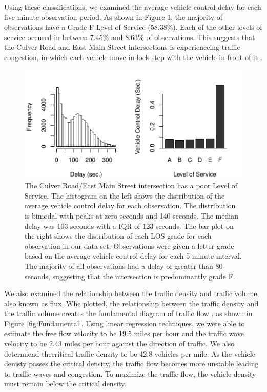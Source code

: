 \documentclass{report}
\begin{document}
Using these classifications, we examined the average vehicle control delay for
each five minute observation period. As shown in Figure \ref{fig:LOSfigure},
the majority of observations have a Grade F Level of Service (58.38\%). Each of
the other levels of service occured in between 7.45\% and 8.63\% of observations.
This suggests that the Culver Road and East Main Street intersections is
experienceing traffic congestion, in which each vehicle move in lock step with
the vehicle in front of it \cite{HCM}.

\begin{figure}[h]
\centering
\includegraphics{upstat_report-LOCplot}
\caption{The Culver Road/East Main Street
intersection has a poor Level of Service. The histogram on the left shows the
distribution of the average vehicle control delay for each observation. The
distribution is bimodal with peaks at zero seconds and 140 seconds. The median
delay was 103 seconds with a IQR of
123 seconds. The bar plot on the right shows the
distribution of each LOS grade for each observation in our data set.
Observations were given a letter grade based on the average vehicle control
delay for each 5 minute interval. The majority of all observations had a delay
of greater than 80 seconds, suggesting that the intersection is predominantly grade
F.}
\label{fig:LOSfigure}
\end{figure}

We also examined the relationship between the traffic density and traffic volume,
also known as flux. Whe plotted, the relationship between the traffic density
and the traffic volume creates the fundamental diagram of traffic flow
\cite{HCM}, as shown in Figure \ref{fig:Fundamental}. Using linear regression techniques, we
were able to estimate the free flow velocity to be 19.5 miles per hour and the
traffic wave velocity to be 2.43 miles per hour against the direction of traffic.
We also determiend thecritical traffic density to be 42.8 vehicles per mile.
As the vehicle denisty passes the critical density, the traffic flow becomes
more unstable leading to traffic waves and congestion. To maximize
the traffic flow, the vehicle density must remain below the critical density.
\end{document}
